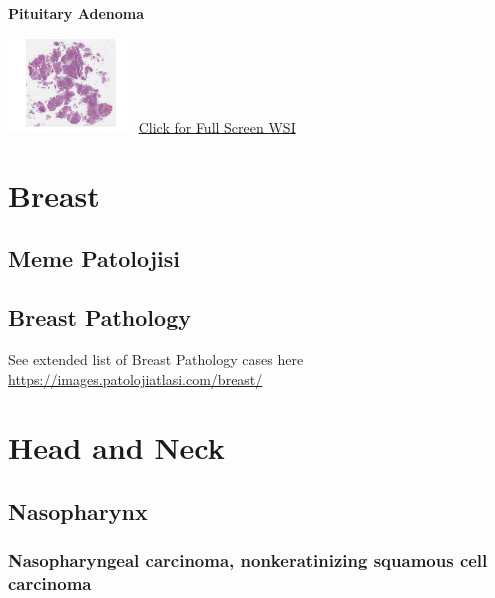 \documentclass[
  letterpaper,
  paper=6in:9in,
  pagesize=pdftex,
  headinclude=on,
  footinclude=on,
  12pt]{scrbook}
\begin{document}
\textbf{Pituitary Adenoma}

\href{https://images.patolojiatlasi.com/pituitary-adenoma/HE.html}{\includegraphics[width=0.25\textwidth,height=\textheight]{./screenshots/pituitary-adenoma_screenshot.png}}
\href{https://images.patolojiatlasi.com/pituitary-adenoma/HE.html}{Click
for Full Screen WSI}

\part{Breast}

\hypertarget{meme-patolojisi}{%
\chapter*{Meme Patolojisi}\label{meme-patolojisi}}


\hypertarget{breast-pathology}{%
\chapter*{Breast Pathology}\label{breast-pathology}}


See extended list of Breast Pathology cases here
\url{https://images.patolojiatlasi.com/breast/}

\part{Head and Neck}

\hypertarget{sec-nasopharynx}{%
\chapter{Nasopharynx}\label{sec-nasopharynx}}

\hypertarget{sec-nasopharyngial-carcinoma-nonkeratinizing-squamous-cell-carcinoma}{%
\section{Nasopharyngeal carcinoma, nonkeratinizing squamous cell
carcinoma}\label{sec-nasopharyngial-carcinoma-nonkeratinizing-squamous-cell-carcinoma}}
\end{document}
